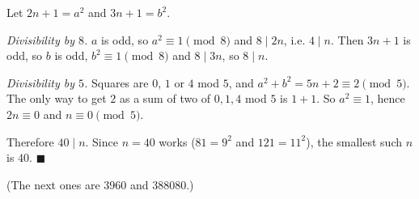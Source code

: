 Let $2n+1=a^2$ and $3n+1=b^2$.

\emph{Divisibility by $8$.} $a$ is odd, so $a^2\equiv1\pmod8$ and $8\mid2n$, i.e. $4\mid n$. Then $3n+1$ is odd, so $b$ is odd, $b^2\equiv1\pmod8$ and $8\mid3n$, so $8\mid n$.

\emph{Divisibility by $5$.} Squares are $0$, $1$ or $4$ mod $5$, and $a^2+b^2=5n+2\equiv2\pmod5$. The only way to get $2$ as a sum of two of $0,1,4$ mod $5$ is $1+1$. So $a^2\equiv1$, hence $2n\equiv0$ and $n\equiv0\pmod5$.

Therefore $40\mid n$. Since $n=40$ works ($81=9^2$ and $121=11^2$), the smallest such $n$ is $\boxed{40}$. $\blacksquare$

(The next ones are $3960$ and $388080$.)
